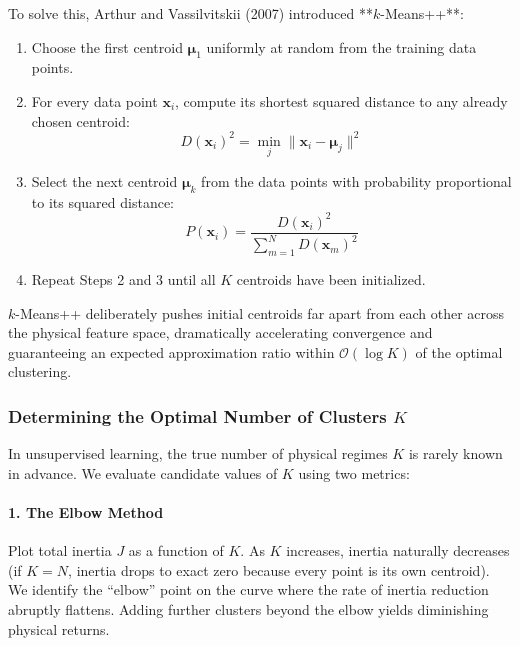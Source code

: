 To solve this, Arthur and Vassilvitskii (2007) introduced **$k$-Means++**:
\begin{enumerate}
    \item Choose the first centroid $\boldsymbol{\mu}_1$ uniformly at random from the training data points.
    \item For every data point $\mathbf{x}_i$, compute its shortest squared distance to any already chosen centroid:
    \begin{equation}
    D(\mathbf{x}_i)^2 = \min_{j} \|\mathbf{x}_i - \boldsymbol{\mu}_j\|^2
    \end{equation}
    \item Select the next centroid $\boldsymbol{\mu}_k$ from the data points with probability proportional to its squared distance:
    \begin{equation}
    P(\mathbf{x}_i) = \frac{D(\mathbf{x}_i)^2}{\sum_{m=1}^{N} D(\mathbf{x}_m)^2}\label{eq:kmeans_plus_prob}
    \end{equation}
    \item Repeat Steps 2 and 3 until all $K$ centroids have been initialized.
\end{enumerate}
$k$-Means++ deliberately pushes initial centroids far apart from each other across the physical feature space, dramatically accelerating convergence and guaranteeing an expected approximation ratio within $\mathcal{O}(\log K)$ of the optimal clustering.

\subsubsection{Determining the Optimal Number of Clusters $K$}
In unsupervised learning, the true number of physical regimes $K$ is rarely known in advance. We evaluate candidate values of $K$ using two metrics:

\paragraph{1. The Elbow Method}
Plot total inertia $J$ as a function of $K$. As $K$ increases, inertia naturally decreases (if $K = N$, inertia drops to exact zero because every point is its own centroid). We identify the ``elbow'' point on the curve where the rate of inertia reduction abruptly flattens. Adding further clusters beyond the elbow yields diminishing physical returns.

